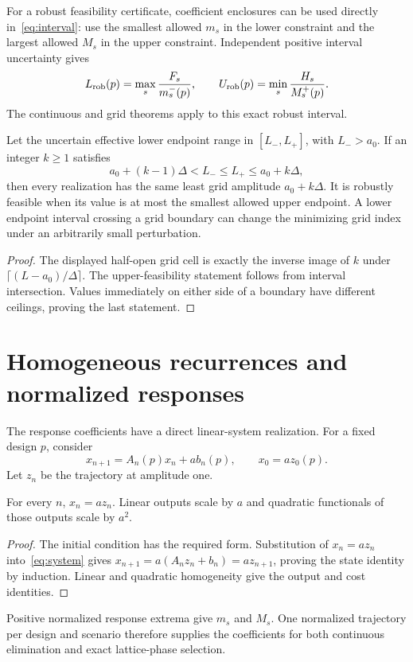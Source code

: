 \documentclass[11pt,a4paper]{article}
\begin{document}
For a robust feasibility certificate, coefficient enclosures can be used
directly in~\eqref{eq:interval}: use the smallest allowed $m_s$ in the
lower constraint and the largest allowed $M_s$ in the upper constraint.
Independent positive interval uncertainty gives
\[
 L_{\rm rob}(p)=\max_s\frac{F_s}{m_s^-(p)},\qquad
 U_{\rm rob}(p)=\min_s\frac{H_s}{M_s^+(p)}.
\]
The continuous and grid theorems apply to this exact robust interval.

\begin{proposition}\label{prop:gridstable}
Let the uncertain effective lower endpoint range in
$[L_-,L_+]$, with $L_->a_0$. If an integer $k\ge1$ satisfies
\[
 a_0+(k-1)\Delta<L_-\le L_+\le a_0+k\Delta,
\]
then every realization has the same least grid amplitude $a_0+k\Delta$.
It is robustly feasible when its value is at most the smallest allowed
upper endpoint. A lower endpoint interval crossing a grid boundary can
change the minimizing grid index under an arbitrarily small perturbation.
\end{proposition}
\begin{proof}
The displayed half-open grid cell is exactly the inverse image of $k$ under
$\lceil(L-a_0)/\Delta\rceil$. The upper-feasibility statement follows from
interval intersection. Values immediately on either side of a boundary
have different ceilings, proving the last statement.
\end{proof}

\section{Homogeneous recurrences and normalized responses}
The response coefficients have a direct linear-system realization.
For a fixed design $p$, consider
\begin{equation}\label{eq:system}
 x_{n+1}=A_n(p)x_n+a b_n(p),\qquad x_0=a z_0(p).
\end{equation}
Let $z_n$ be the trajectory at amplitude one.
\begin{lemma}\label{lem:homogeneous}
For every $n$, $x_n=a z_n$. Linear outputs scale by $a$ and quadratic
functionals of those outputs scale by $a^2$.
\end{lemma}
\begin{proof}
The initial condition has the required form. Substitution of $x_n=a z_n$
into~\eqref{eq:system} gives $x_{n+1}=a(A_nz_n+b_n)=a z_{n+1}$, proving
the state identity by induction. Linear and quadratic homogeneity give
the output and cost identities.
\end{proof}
Positive normalized response extrema give $m_s$ and $M_s$. One normalized
trajectory per design and scenario therefore supplies the coefficients for
both continuous elimination and exact lattice-phase selection.
\end{document}
